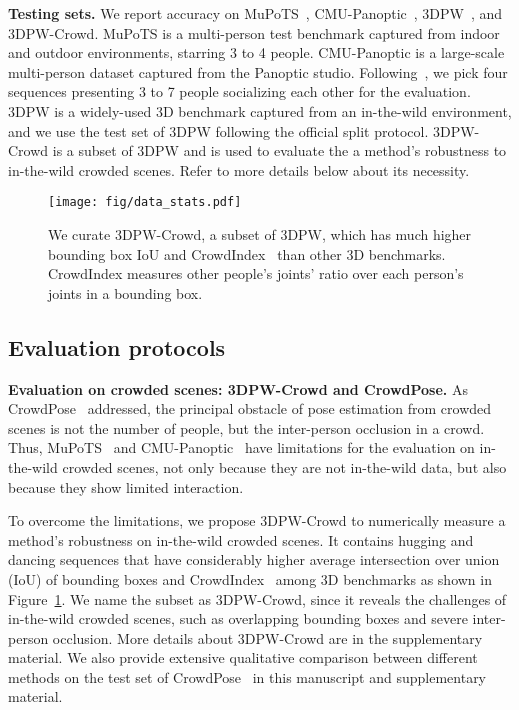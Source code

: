 \documentclass[10pt,twocolumn,letterpaper]{article}
\begin{document}
\noindent\textbf{Testing sets.}
We report accuracy on MuPoTS~\cite{mehta2018single}, CMU-Panoptic~\cite{joo2017panoptic}, 3DPW~\cite{von20183dpw}, and 3DPW-Crowd.
MuPoTS is a multi-person test benchmark captured from indoor and outdoor environments, starring 3 to 4 people.
CMU-Panoptic is a large-scale multi-person dataset captured from the Panoptic studio.
Following~\cite{zanfir2018deep,jiang2020coherent}, we pick four sequences presenting 3 to 7 people socializing each other for the evaluation.
3DPW is a widely-used 3D benchmark captured from an in-the-wild environment, and we use the test set of 3DPW following the official split protocol.
3DPW-Crowd is a subset of 3DPW and is used to evaluate the a method's robustness to in-the-wild crowded scenes.
Refer to more details below about its necessity.

\begin{figure}[t]
\begin{center}
\texttt{[image: fig/data\_stats.pdf]}
\vspace*{-1em}
\end{center}
   \caption{
   We curate 3DPW-Crowd, a subset of 3DPW, which has much higher bounding box IoU and CrowdIndex~\cite{li2019crowdpose} than other 3D benchmarks. CrowdIndex measures other people's joints' ratio over each person's joints in a bounding box. 
}
\label{fig:data_statistics}
\vspace*{-1em}
\end{figure}

\subsection{Evaluation protocols}

\noindent\textbf{Evaluation on crowded scenes: 3DPW-Crowd and CrowdPose.}
As CrowdPose~\cite{li2019crowdpose} addressed, the principal obstacle of pose estimation from crowded scenes is not the number of people, but the inter-person occlusion in a crowd.
Thus, MuPoTS~\cite{mehta2018single} and CMU-Panoptic~\cite{joo2017panoptic} have limitations for the evaluation on in-the-wild crowded scenes, not only because they are not in-the-wild data, but also because they show limited interaction.

To overcome the limitations, we propose 3DPW-Crowd to numerically measure a method's robustness on in-the-wild crowded scenes. 
It contains hugging and dancing sequences that have considerably higher average intersection over union (IoU) of bounding boxes and CrowdIndex~\cite{li2019crowdpose} among 3D benchmarks as shown in Figure~\ref{fig:data_statistics}.
We name the subset as 3DPW-Crowd, since it reveals the challenges of in-the-wild crowded scenes, such as overlapping bounding boxes and severe inter-person occlusion.
More details about 3DPW-Crowd are in the supplementary material.
We also provide extensive qualitative comparison between different methods on the test set of CrowdPose~\cite{li2019crowdpose} in this manuscript and supplementary material.
\end{document}
